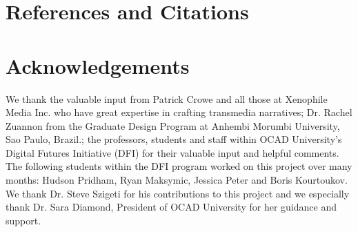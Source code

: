 \documentclass{chi-ext}
\begin{document}
\section{References and Citations}

\section{Acknowledgements}
We thank the valuable input from Patrick Crowe and all those at Xenophile Media Inc. who have great expertise in crafting transmedia narratives; Dr. Rachel Zuannon from the Graduate Design Program at Anhembi Morumbi University, Sao Paulo, Brazil.; the professors, students and staff within OCAD University's Digital Futures Initiative (DFI) for their valuable input and helpful comments. The following students within the DFI program worked on this project over many months: Hudson Pridham, Ryan Maksymic, Jessica Peter and Boris Kourtoukov. We thank Dr. Steve Szigeti for his contributions to this project and we especially thank Dr. Sara Diamond, President of OCAD University for her guidance and support.

\balance


\end{document}
